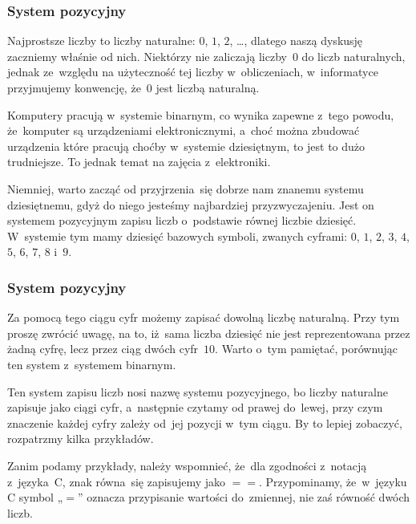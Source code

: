 \documentclass[10pt,t]{beamer}
\begin{document}
\begin{frame}
  \frametitle{System pozycyjny}


  Najprostsze liczby to liczby naturalne: $0$, $1$, $2$, \ldots, dlatego
  naszą dyskusję zaczniemy właśnie od nich. Niektórzy nie zaliczają
  liczby~$0$ do liczb naturalnych, jednak ze~względu na użyteczność tej
  liczby w~obliczeniach, w~informatyce przyjmujemy konwencję, że~$0$ jest
  liczbą naturalną.

  Komputery pracują w~systemie binarnym, co wynika zapewne z~tego powodu,
  że~komputer są urządzeniami elektronicznymi, a~choć można zbudować
  urządzenia które pracują choćby w~systemie dziesiętnym, to jest to dużo
  trudniejsze. To jednak temat na zajęcia z~elektroniki.

  Niemniej, warto zacząć od przyjrzenia~się dobrze nam znanemu systemu
  dziesiętnemu, gdyż do niego jesteśmy najbardziej przyzwyczajeniu.
  Jest on systemem pozycyjnym zapisu liczb o~podstawie równej liczbie
  dziesięć. W~systemie tym mamy dziesięć bazowych symboli, zwanych cyframi:
  $0$, $1$, $2$, $3$, $4$, $5$, $6$, $7$, $8$ i~$9$.

\end{frame}





\begin{frame}
  \frametitle{System pozycyjny}


  Za pomocą tego ciągu cyfr możemy zapisać dowolną liczbę naturalną. Przy
  tym proszę zwrócić uwagę, na to, iż~sama liczba dziesięć \alert{nie jest}
  reprezentowana przez żadną cyfrę, lecz przez ciąg dwóch cyfr~$10$.
  Warto o~tym pamiętać, porównując ten system z~systemem binarnym.

  Ten system zapisu liczb nosi nazwę systemu pozycyjnego, bo liczby
  naturalne zapisuje jako ciągi cyfr, a~następnie czytamy od prawej
  do~lewej, przy czym znaczenie każdej cyfry zależy od~jej \alert{pozycji}
  w~tym ciągu. By to lepiej zobaczyć, rozpatrzmy kilka przykładów.

  Zanim podamy przykłady, należy wspomnieć, że~dla zgodności z~notacją
  z~języka~C, znak równa~się zapisujemy jako $==$. Przypominamy,
  że~w~języku C symbol „$=$” oznacza \alert{przypisanie} wartości
  do~zmiennej, nie zaś równość dwóch liczb.

\end{frame}
\end{document}
